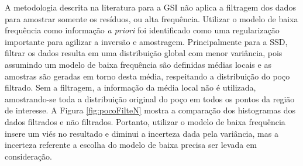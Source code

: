 A metodologia descrita na literatura para a GSI não aplica a filtragem dos dados
para amostrar somente os resíduos, ou alta frequência. Utilizar o modelo de
baixa frequência como informação \textit{a priori} foi identificado como uma
regularização importante para agilizar a inversão e amostragem. Principalmente
para a SSD, filtrar os dados resulta em uma distribuição global com menor
variância, pois assumindo um modelo de baixa frequência são definidas médias
locais e as amostras são geradas em torno desta média, respeitando a
distribuição do poço filtrado. Sem a filtragem, a informação da média local não
é utilizada, amostrando-se toda a distribuição original do poço em todos os
pontos da região de interesse. A Figura \ref{fig:pocoFilteN} mostra a comparação
dos histogramas dos dados filtrados e não filtrados. Portanto, utilizar o modelo
de baixa frequência insere um viés no resultado e diminui a incerteza dada pela
variância, mas a incerteza referente a escolha do modelo de baixa precisa ser
levada em consideração.


